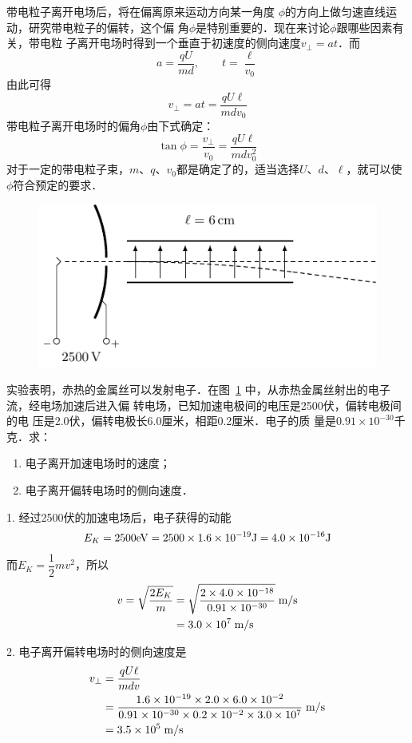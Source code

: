 带电粒子离开电场后，将在偏离原来运动方向某一角度
$\phi$的方向上做匀速直线运动，研究带电粒子的偏转，这个偏
角$\phi$是特别重要的．现在来讨论$\phi$跟哪些因素有关，带电粒
子离开电场时得到一个垂直于初速度的侧向速度$v_{\bot}=at$．而
\[a=\frac{qU}{md},\qquad t=\frac{\ell}{v_0} \]
由此可得
\[v_{\bot}=at=\frac{qU\ell}{mdv_0} \]
带电粒子离开电场时的偏角$\phi$由下式确定：
\[\tan\phi=\frac{v_{\bot}}{v_0}=\frac{qU\ell}{mdv^2_0} \]
对于一定的带电粒子束，$m$、$q$、$v_0$都是确定了的，适当选择$U$、$d$、$\ell$，就可以使
$\phi$符合预定的要求．

\begin{example}
\begin{figure}[htbp]
    \centering
    \includegraphics{fig/B/6-29.pdf}
    \caption{}\label{fig_B_6-29}
\end{figure}

    实验表明，赤热的金属丝可以发射电子．在图~\ref{fig_B_6-29} 
中，从赤热金属丝射出的电子流，经电场加速后进入偏
转电场，已知加速电极间的电压是2500伏，偏转电极间的电
压是2.0伏，偏转电极长6.0厘米，相距0.2厘米．电子的质
量是$0.91\times10^{-30}$千克．求：
\begin{enumerate}
    \item 电子离开加速电场时的速度；
    \item 电子离开偏转电场时的侧向速度．
\end{enumerate}
\end{example}

\begin{solution}
1. 经过2500伏的加速电场后，电子获得的动能
\[E_K=2500{\rm eV}=2500\times1.6\times10^{-19}{\rm J}=4.0\times10^{-16}{\rm J} \]
而$E_K=\dfrac{1}{2}mv^2$，所以
\[\begin{split}
    v=\sqrt{\frac{2E_K}{m}}&=\sqrt{\frac{2\times 4.0\times 10^{-18}}{0.91\times 10^{-30}}}\;\text{m}/\text{s}\\
    &=3.0\times 10^7\;\text{m}/\text{s}
\end{split} \]    

2. 电子离开偏转电场时的侧向速度是
\[\begin{split}
    v_{\bot}&=\frac{qU\ell}{mdv}\\
    &=\frac{1.6\times10^{-19}\times2.0\times6.0\times10^{-2}}{0.91\times10^{-30}\times0.2\times10^{-2}\times3.0\times10^{7}} \;\text{m}/\text{s}\\
    &=3.5\times 10^5\;\text{m}/\text{s}
\end{split} \]    
\end{solution}

